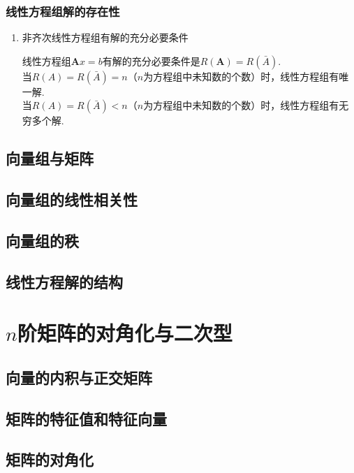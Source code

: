 \documentclass[lang=cn,10pt]{elegantbook}
\newcommand{\matA}{\mathbf{A}}
\begin{document}
		\subsection{线性方程组解的存在性}
		\begin{enumerate}
			\item 非齐次线性方程组有解的充分必要条件
			\begin{theorem}
				线性方程组\( \matA x = b \)有解的充分必要条件是\( R(\matA) = R(\bar{A}) \). \\
				当\( R(A) = R(\bar{A}) = n \)（\( n \)为方程组中未知数的个数）时，线性方程组有唯一解. \\
				当\( R(A) = R(\bar{A}) < n \)（\( n \)为方程组中未知数的个数）时，线性方程组有无穷多个解.
			\end{theorem}

		\end{enumerate}
	\section{向量组与矩阵}
	
	\section{向量组的线性相关性}
	
	\section{向量组的秩}
	
	\section{线性方程解的结构}
	
\chapter{\( n \)阶矩阵的对角化与二次型}

	\section{向量的内积与正交矩阵}
	
	\section{矩阵的特征值和特征向量}
	
	\section{矩阵的对角化}
	
\end{document}
